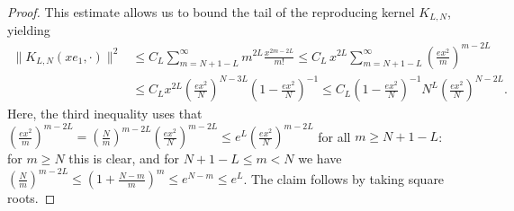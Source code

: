 \documentclass[10pt,a4paper]{amsart}
\begin{document}
\begin{proof}
    This estimate allows us to bound the tail of the reproducing kernel $K_{L,N}$, yielding
    \begin{align*}
        \| K_{L,N}(x e_1,\cdot) \|^2 &\leq C_{L} \sum_{m=N+1-L}^{\infty} m^{2L} \frac{x^{2m-2L}}{m!} \leq C_L \, x^{2L} \sum_{m=N+1-L}^{\infty} \left( \frac{ex^2}{m} \right)^{m-2L} \\
        &\leq C_L x^{2L} \left( \frac{ex^2}{N} \right)^{N-3L} \left( 1 - \frac{ex^2}{N}\right)^{-1} \leq C_L  \left( 1 - \frac{ex^2}{N}\right)^{-1} N^{L} \left( \frac{ex^2}{N} \right)^{N-2L}.
    \end{align*}
    Here, the third inequality uses that $\left(\frac{ex^2}{m}\right)^{m-2L} = \left(\frac{N}{m}\right)^{m-2L}\left(\frac{ex^2}{N}\right)^{m-2L} \leq e^{L}\left(\frac{ex^2}{N}\right)^{m-2L}$ for all $m \geq N+1-L$: for $m \geq N$ this is clear, and for $N+1-L \leq m < N$ we have $\left(\frac Nm\right)^{m-2L} \leq \left(1 + \frac{N-m}{m}\right)^{m} \leq e^{N-m} \leq e^{L}$. The claim follows by taking square roots.
    \end{proof}
\end{document}
